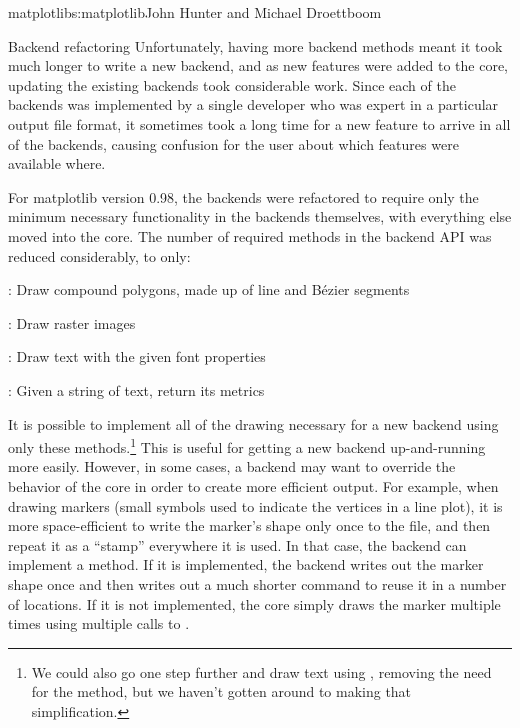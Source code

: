 \begin{aosachapter}{matplotlib}{s:matplotlib}{John Hunter and Michael Droettboom}
\begin{aosasect1}{Backend refactoring}
Unfortunately, having more backend methods meant it took much longer
to write a new backend, and as new features were added to the core,
updating the existing backends took considerable work.  Since each of
the backends was implemented by a single developer who was expert in a
particular output file format, it sometimes took a long time for a new
feature to arrive in all of the backends, causing confusion for the
user about which features were available where.

For matplotlib version 0.98, the backends were refactored to require
only the minimum necessary functionality in the backends themselves,
with everything else moved into the core.  The number of required
methods in the backend API was reduced considerably, to only:

\begin{aosaitemize}

  \item {}: Draw compound polygons, made up of line and
    B\'ezier segments

  \item {}: Draw raster images

  \item {}: Draw text with the given font properties

  \item {}: Given a string of
    text, return its metrics

\end{aosaitemize}

It is possible to implement all of the drawing necessary for a new
backend using only these methods.\footnote{We could also go one step
further and draw text using , removing the need for
the  method, but we haven't gotten around to making
that simplification.}  This is useful for getting a new backend
up-and-running more easily.  However, in some cases, a backend may
want to override the behavior of the core in order to create more
efficient output.  For example, when drawing markers (small symbols
used to indicate the vertices in a line plot), it is more
space-efficient to write the marker's shape only once to the file, and
then repeat it as a ``stamp'' everywhere it is used.  In that case,
the backend can implement a  method.  If it is
implemented, the backend writes out the marker shape once and then
writes out a much shorter command to reuse it in a number of
locations.  If it is not implemented, the core simply draws the marker
multiple times using multiple calls to .


\end{aosasect1}
\end{aosachapter}
